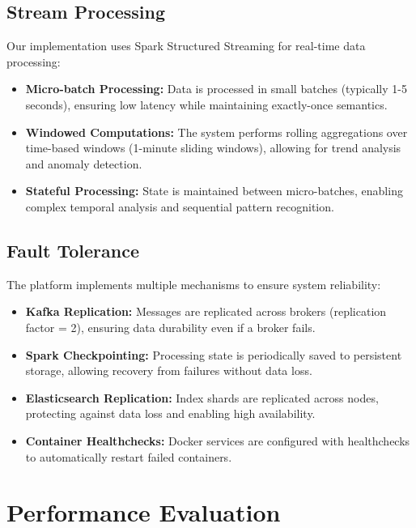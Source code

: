 \documentclass[11pt, a4paper]{article}
\begin{document}
\subsection{Stream Processing}
Our implementation uses Spark Structured Streaming for real-time data processing:

\begin{itemize}[leftmargin=*]
  \item \textbf{Micro-batch Processing:} Data is processed in small batches (typically 1-5 seconds), ensuring low latency while maintaining exactly-once semantics.
  
  \item \textbf{Windowed Computations:} The system performs rolling aggregations over time-based windows (1-minute sliding windows), allowing for trend analysis and anomaly detection.
  
  \item \textbf{Stateful Processing:} State is maintained between micro-batches, enabling complex temporal analysis and sequential pattern recognition.
\end{itemize}

\subsection{Fault Tolerance}
The platform implements multiple mechanisms to ensure system reliability:

\begin{itemize}[leftmargin=*]
  \item \textbf{Kafka Replication:} Messages are replicated across brokers (replication factor = 2), ensuring data durability even if a broker fails.
  
  \item \textbf{Spark Checkpointing:} Processing state is periodically saved to persistent storage, allowing recovery from failures without data loss.
  
  \item \textbf{Elasticsearch Replication:} Index shards are replicated across nodes, protecting against data loss and enabling high availability.
  
  \item \textbf{Container Healthchecks:} Docker services are configured with healthchecks to automatically restart failed containers.
\end{itemize}

\clearpage
\section{Performance Evaluation}
\end{document}
